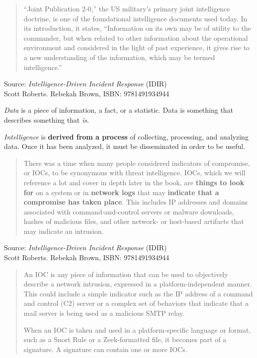 \documentclass[Screen16to9,17pt]{foils}
\begin{document}


\begin{quote}
“Joint Publication 2-0,” the US military’s primary joint intelligence doctrine, is one of
the foundational intelligence documents used today. In its introduction, it states,
“Information on its own may be of utility to the commander, but when related to
other information about the operational environment and considered in the light of
past experience, it gives rise to a new understanding of the information, which may
be termed intelligence.”
\end{quote}
Source: \emph{Intelligence-Driven Incident Response} (IDIR)\\
 Scott Roberts. Rebekah Brown, ISBN: 9781491934944

\begin{list2}
\item \emph{Data} is a piece of information, a fact, or a statistic. Data is something that describes something that \emph{is}.
\item \emph{Intelligence} is {\bf derived from a process} of collecting, processing, and analyzing data. Once it has been analyzed, it must be disseminated in order to be useful.
\end{list2}


\begin{quote}
There was a time when many people considered indicators of compromise, or IOCs,
to be synonymous with threat intelligence. IOCs, which we will reference a lot and
cover in depth later in the book, are {\bf things to look for} on a system or in {\bf network logs} that may {\bf indicate that a compromise has taken place}. This includes IP addresses and domains associated with command-and-control servers or malware downloads, hashes of malicious files, and other network- or host-based artifacts that may indicate an intrusion.
\end{quote}
Source: \emph{Intelligence-Driven Incident Response} (IDIR)\\
 Scott Roberts. Rebekah Brown, ISBN: 9781491934944




\begin{quote}
An IOC is any piece of information that can be used to objectively describe a
network intrusion, expressed in a platform-independent manner. This could include a simple indicator such as the IP address of a command and control (C2) server or a complex set of behaviors that indicate that a mail server is being used as a malicious SMTP relay.

When an IOC is taken and used in a platform-specific language or format, such as a Snort Rule or a Zeek-formatted file, it becomes part of a signature. A signature can contain one or more IOCs.
\end{quote}
\end{document}
